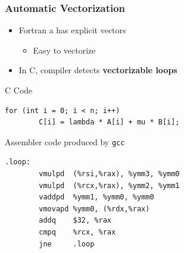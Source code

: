 \documentclass[xcolor={x11names,svgnames}]{beamer}
\begin{document}
\begin{frame}[fragile=singleslide]
  \frametitle{Automatic Vectorization }

  \begin{itemize}
  \item Fortran a has explicit vectors
    \begin{itemize}
    \item Easy to vectorize
    \end{itemize}
    \item In C, compiler detects \textbf{vectorizable loops}

  \end{itemize}

\begin{exampleblock}{C Code}
\begin{verbatim}
for (int i = 0; i < n; i++)
        C[i] = lambda * A[i] + mu * B[i];
\end{verbatim}
\end{exampleblock}

\begin{alertblock}{Assembler code produced by \texttt{gcc}}

\begin{verbatim}
.loop:
        vmulpd  (%rsi,%rax), %ymm3, %ymm0    
        vmulpd  (%rcx,%rax), %ymm2, %ymm1
        vaddpd  %ymm1, %ymm0, %ymm0
        vmovapd %ymm0, (%rdx,%rax)
        addq    $32, %rax
        cmpq    %rcx, %rax
        jne     .loop
\end{verbatim}
\end{alertblock}%
\end{frame}


\end{document}

